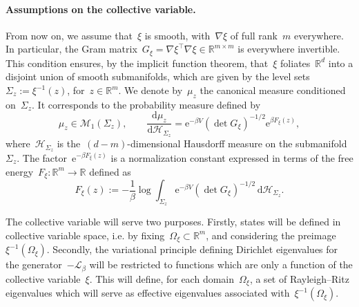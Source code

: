 \documentclass[a4]{article}
\newcommand{\cL}{\mathcal{L}}
\renewcommand{\d}{\mathrm{d}}
\newcommand{\e}{\mathrm{e}}
\newcommand{\R}{\mathbb{R}}
\newcommand{\1}{\mathbbm 1}
\newcommand{\dsint}{\displaystyle\int}
\begin{document}
    \paragraph{Assumptions on the collective variable.}
    From now on, we assume that~$\xi$ is smooth, with~$\nabla \xi$ of full rank~$m$ everywhere. In particular, the Gram matrix~$G_\xi = \nabla\xi^\top\nabla\xi\in \R^{m\times m}$ is everywhere invertible. This condition ensures, by the implicit function theorem, that~$\xi$ foliates~$\R^d$ into a disjoint union of smooth submanifolds, which are given by the level sets~$\Sigma_z :=\xi^{-1}(z)$, for~$z\in\R^m$.
    We denote by~$\mu_z$ the canonical measure conditioned on~$\Sigma_z$. It corresponds to the probability measure defined by
    \begin{equation}
        \label{eq:conditional_measure}
        \mu_z\in \mathcal M_1(\Sigma_z),\qquad\frac{\d \mu_z}{\d \mathcal H_{\Sigma_z}} = \e^{-\beta V}\left(\det G_\xi\right)^{-1/2}\e^{\beta F_\xi(z)},
    \end{equation}
    where~$\mathcal H_{\Sigma_z}$ is the~$(d-m)$-dimensional Hausdorff measure on the submanifold~$\Sigma_z$. The factor~$\e^{-\beta F_\xi(z)}$ is a normalization constant expressed in terms of the free energy~$F_\xi:\R^m\to\R$ defined as
    \begin{equation}
        \label{eq:free_energy}
        F_\xi(z) :=-\frac1\beta\log\dsint_{\Sigma_z}\e^{-\beta V}\left(\det G_\xi\right)^{-1/2}\,\d\mathcal H_{\Sigma_z}.
    \end{equation}

    The collective variable will serve two purposes. Firstly, states will be defined in collective variable space, i.e. by fixing~$\Omega_\xi\subset \R^m$, and considering the preimage~$\xi^{-1}(\Omega_\xi)$. Secondly, the variational principle defining Dirichlet eigenvalues for the generator~$-\cL_\beta$ will be restricted to functions which are only a function of the collective variable~$\xi$. This will define, for each domain~$\Omega_\xi$, a set of Rayleigh--Ritz eigenvalues which will serve as effective eigenvalues associated with~$\xi^{-1}(\Omega_\xi)$.
\end{document}
